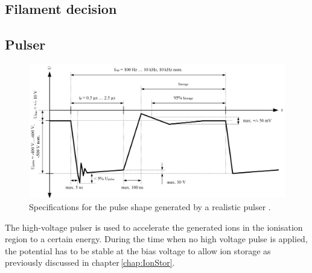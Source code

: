 	\subsection{Filament decision}


		\subsection{Pulser }
	\begin{figure}[h!]
		\centering
		\includegraphics[width=\textwidth]{Bilder/Pulser_theretical_shape.jpg}
		\caption{Specifications for the pulse shape generated by a realistic pulser \cite{Diss_Meyer}.}
		\label{fig:PulserTheoCurve}
	\end{figure}
	The high-voltage pulser is used to accelerate the generated ions in the ionisation region to a certain energy. During the time when no high voltage pulse is applied, the potential has to be stable at the bias voltage to allow ion storage as previously discussed in chapter\,\ref{chap:IonStor}.\\
